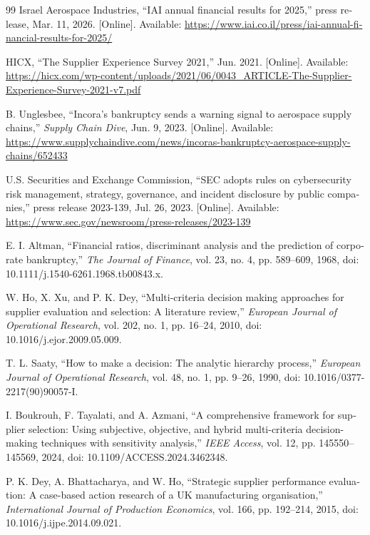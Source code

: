 \begin{otherlanguage}{english}
\begin{thebibliography}{99}
Israel Aerospace Industries, ``IAI annual financial results for 2025,'' press release, Mar. 11, 2026. [Online]. Available: \url{https://www.iai.co.il/press/iai-annual-financial-results-for-2025/}

HICX, ``The Supplier Experience Survey 2021,'' Jun. 2021. [Online]. Available: \url{https://hicx.com/wp-content/uploads/2021/06/0043_ARTICLE-The-Supplier-Experience-Survey-2021-v7.pdf}

B. Unglesbee, ``Incora's bankruptcy sends a warning signal to aerospace supply chains,'' \emph{Supply Chain Dive}, Jun. 9, 2023. [Online]. Available: \url{https://www.supplychaindive.com/news/incoras-bankruptcy-aerospace-supply-chains/652433}

U.S. Securities and Exchange Commission, ``SEC adopts rules on cybersecurity risk management, strategy, governance, and incident disclosure by public companies,'' press release 2023-139, Jul. 26, 2023. [Online]. Available: \url{https://www.sec.gov/newsroom/press-releases/2023-139}

E. I. Altman, ``Financial ratios, discriminant analysis and the prediction of corporate bankruptcy,'' \emph{The Journal of Finance}, vol. 23, no. 4, pp. 589--609, 1968, doi: 10.1111/j.1540-6261.1968.tb00843.x.

W. Ho, X. Xu, and P. K. Dey, ``Multi-criteria decision making approaches for supplier evaluation and selection: A literature review,'' \emph{European Journal of Operational Research}, vol. 202, no. 1, pp. 16--24, 2010, doi: 10.1016/j.ejor.2009.05.009.

T. L. Saaty, ``How to make a decision: The analytic hierarchy process,'' \emph{European Journal of Operational Research}, vol. 48, no. 1, pp. 9--26, 1990, doi: 10.1016/0377-2217(90)90057-I.

I. Boukrouh, F. Tayalati, and A. Azmani, ``A comprehensive framework for supplier selection: Using subjective, objective, and hybrid multi-criteria decision-making techniques with sensitivity analysis,'' \emph{IEEE Access}, vol. 12, pp. 145550--145569, 2024, doi: 10.1109/ACCESS.2024.3462348.

P. K. Dey, A. Bhattacharya, and W. Ho, ``Strategic supplier performance evaluation: A case-based action research of a UK manufacturing organisation,'' \emph{International Journal of Production Economics}, vol. 166, pp. 192--214, 2015, doi: 10.1016/j.ijpe.2014.09.021.


\end{thebibliography}
\end{otherlanguage}
